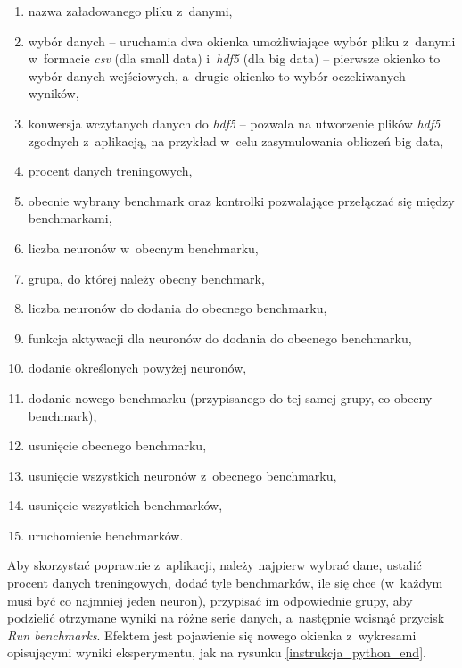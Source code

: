 \documentclass[pl]{minipw} %
\begin{document}
\begin{enumerate}
\item nazwa załadowanego pliku z~danymi,
\item wybór danych -- uruchamia dwa okienka umożliwiające wybór pliku z~danymi w~formacie \textit{csv} (dla small data) i~\textit{hdf5} (dla big data) -- pierwsze okienko to wybór danych wejściowych, a~drugie okienko to wybór oczekiwanych wyników,
\item konwersja wczytanych danych do \textit{hdf5} -- pozwala na utworzenie plików \textit{hdf5} zgodnych z~aplikacją, na przykład w~celu zasymulowania obliczeń big data,
\item procent danych treningowych,
\item obecnie wybrany benchmark oraz kontrolki pozwalające przełączać się między benchmarkami,
\item liczba neuronów w~obecnym benchmarku,
\item grupa, do której należy obecny benchmark,
\item liczba neuronów do dodania do obecnego benchmarku,
\item funkcja aktywacji dla neuronów do dodania do obecnego benchmarku,
\item dodanie określonych powyżej neuronów,
\item dodanie nowego benchmarku (przypisanego do tej samej grupy, co obecny benchmark),
\item usunięcie obecnego benchmarku,
\item usunięcie wszystkich neuronów z~obecnego benchmarku,
\item usunięcie wszystkich benchmarków,
\item uruchomienie benchmarków.
\end{enumerate}
Aby skorzystać poprawnie z~aplikacji, należy najpierw wybrać dane, ustalić procent danych treningowych, dodać tyle benchmarków, ile się chce (w~każdym musi być co najmniej jeden neuron), przypisać im odpowiednie grupy, aby podzielić otrzymane wyniki na różne serie danych, a~następnie wcisnąć przycisk \textit{Run benchmarks}. Efektem jest pojawienie się nowego okienka z~wykresami opisującymi wyniki eksperymentu, jak na rysunku \ref{instrukcja_python_end}.
\end{document}
